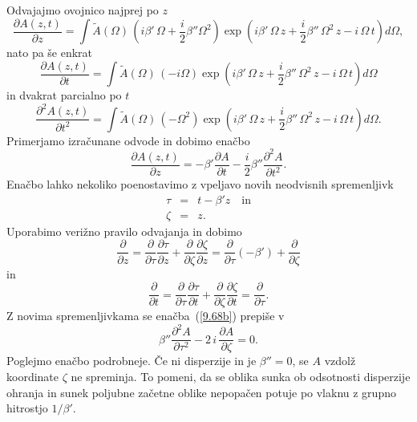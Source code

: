 Odvajajmo ovojnico najprej po $z$
\begin{equation}
 \frac{\partial A(z,t)}{\partial z} = \int \tilde{A}(\Omega)\, 
 \left(i \beta'\, \Omega + \frac{i}{2}\beta''\Omega^2 \right) 
 \exp \left(i \beta'\, \Omega\,z + 
 \frac{i}{2}\beta''\,\Omega^2\, z - i\, \Omega\, t\right) d\Omega,
\label{9.67a}
\end{equation}
nato pa še enkrat 
\begin{equation}
 \frac{\partial A(z,t)}{\partial t} = \int \tilde{A}(\Omega)\, 
 \left(-i\Omega\right) 
 \exp \left(i \beta'\, \Omega\,z + 
 \frac{i}{2}\beta''\,\Omega^2\, z - i\, \Omega\, t\right) d\Omega
\label{9.67b}
\end{equation}
in dvakrat parcialno po $t$
\begin{equation}
 \frac{\partial^2 A(z,t)}{\partial t^2} = \int \tilde{A}(\Omega)\, 
 \left(-\Omega^2\right) 
 \exp \left(i \beta'\, \Omega\,z + 
 \frac{i}{2}\beta''\,\Omega^2\, z - i\, \Omega\, t\right) d\Omega.
\label{9.67c}
\end{equation}
Primerjamo izračunane odvode in dobimo enačbo
\begin{equation}
 \frac{\partial A(z,t)}{\partial z} = -\beta'\frac{\partial A}{\partial t} - \frac{i}{2} \beta''\frac{\partial^2 A}{\partial t^2}.
 \label{9.68b}
\end{equation}
Enačbo lahko nekoliko poenostavimo z vpeljavo novih neodvisnih spremenljivk
\begin{eqnarray}
\tau & = & t-\beta'z\nonumber \quad \mathrm{in}\\
\zeta & = & z.
\label{9.70}
\end{eqnarray}
Uporabimo verižno pravilo odvajanja in dobimo
\begin{equation}
 \frac{\partial}{\partial z}= \frac{\partial}{\partial\tau}\frac{\partial\tau}{\partial z}+ 
 \frac{\partial}{\partial\zeta}\frac{\partial\zeta}{\partial z} = 
 \frac{\partial}{\partial\tau}\left(-\beta'\right)+ \frac{\partial}{\partial \zeta}
\end{equation}
in 
\begin{equation}
 \frac{\partial}{\partial t}= \frac{\partial}{\partial\tau}\frac{\partial\tau}{\partial t}+ 
 \frac{\partial}{\partial\zeta}\frac{\partial\zeta}{\partial t} = 
 \frac{\partial}{\partial\tau}.
\end{equation}
Z novima spremenljivkama se enačba~(\ref{9.68b}) prepiše v 
\begin{equation}
\beta''\frac{\partial^{2}A}{\partial\tau^{2}}-
2\, i\,\frac{\partial A}{\partial\zeta}=0.
\label{9.71}
\end{equation}
Poglejmo enačbo podrobneje. Če ni disperzije in je $\beta''=0$, se $A$
vzdolž koordinate $\zeta$ ne spreminja. To pomeni, da se oblika sunka
ob odsotnosti disperzije ohranja in sunek poljubne začetne oblike nepopačen 
potuje po vlaknu z grupno hitrostjo $1/\beta'$.

